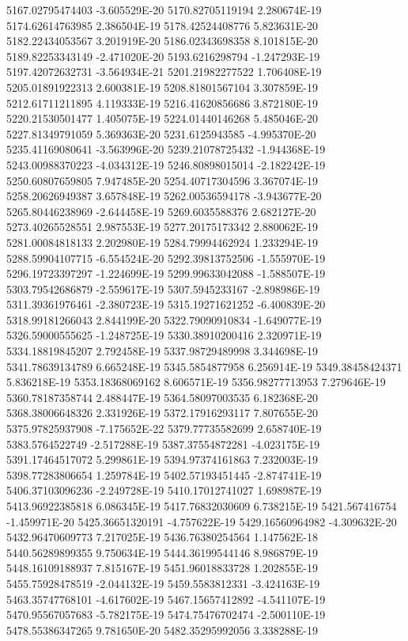 5167.02795474403  -3.605529E-20
5170.82705119194  2.280674E-19
5174.62614763985  2.386504E-19
5178.42524408776  5.823631E-20
5182.22434053567  3.201919E-20
5186.02343698358  8.101815E-20
5189.82253343149  -2.471020E-20
5193.6216298794  -1.247293E-19
5197.42072632731  -3.564934E-21
5201.21982277522  1.706408E-19
5205.01891922313  2.600381E-19
5208.81801567104  3.307859E-19
5212.61711211895  4.119333E-19
5216.41620856686  3.872180E-19
5220.21530501477  1.405075E-19
5224.01440146268  5.485046E-20
5227.81349791059  5.369363E-20
5231.6125943585  -4.995370E-20
5235.41169080641  -3.563996E-20
5239.21078725432  -1.944368E-19
5243.00988370223  -4.034312E-19
5246.80898015014  -2.182242E-19
5250.60807659805  7.947485E-20
5254.40717304596  3.367074E-19
5258.20626949387  3.657848E-19
5262.00536594178  -3.943677E-20
5265.80446238969  -2.644458E-19
5269.6035588376  2.682127E-20
5273.40265528551  2.987553E-19
5277.20175173342  2.880062E-19
5281.00084818133  2.202980E-19
5284.79994462924  1.233294E-19
5288.59904107715  -6.554524E-20
5292.39813752506  -1.555970E-19
5296.19723397297  -1.224699E-19
5299.99633042088  -1.588507E-19
5303.79542686879  -2.559617E-19
5307.5945233167  -2.898986E-19
5311.39361976461  -2.380723E-19
5315.19271621252  -6.400839E-20
5318.99181266043  2.844199E-20
5322.79090910834  -1.649077E-19
5326.59000555625  -1.248725E-19
5330.38910200416  2.320971E-19
5334.18819845207  2.792458E-19
5337.98729489998  3.344698E-19
5341.78639134789  6.665248E-19
5345.5854877958  6.256914E-19
5349.38458424371  5.836218E-19
5353.18368069162  8.606571E-19
5356.98277713953  7.279646E-19
5360.78187358744  2.488447E-19
5364.58097003535  6.182368E-20
5368.38006648326  2.331926E-19
5372.17916293117  7.807655E-20
5375.97825937908  -7.175652E-22
5379.77735582699  2.658740E-19
5383.5764522749  -2.517288E-19
5387.37554872281  -4.023175E-19
5391.17464517072  5.299861E-19
5394.97374161863  7.232003E-19
5398.77283806654  1.259784E-19
5402.57193451445  -2.874741E-19
5406.37103096236  -2.249728E-19
5410.17012741027  1.698987E-19
5413.96922385818  6.086345E-19
5417.76832030609  6.738215E-19
5421.567416754  -1.459971E-20
5425.36651320191  -4.757622E-19
5429.16560964982  -4.309632E-20
5432.96470609773  7.217025E-19
5436.76380254564  1.147562E-18
5440.56289899355  9.750634E-19
5444.36199544146  8.986879E-19
5448.16109188937  7.815167E-19
5451.96018833728  1.202855E-19
5455.75928478519  -2.044132E-19
5459.5583812331  -3.424163E-19
5463.35747768101  -4.617602E-19
5467.15657412892  -4.541107E-19
5470.95567057683  -5.782175E-19
5474.75476702474  -2.500110E-19
5478.55386347265  9.781650E-20
5482.35295992056  3.338288E-19
